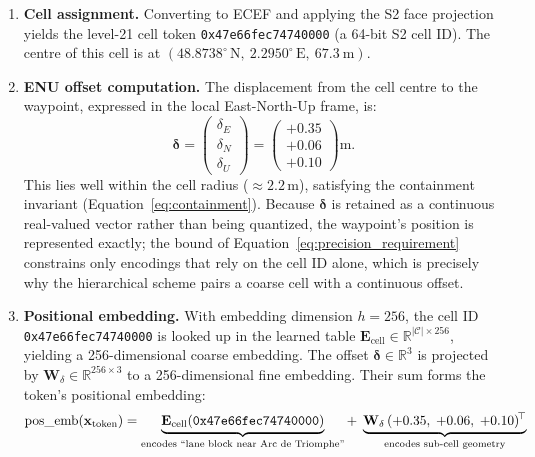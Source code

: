 \documentclass{book}
\begin{document}
\begin{enumerate}

  \item \textbf{Cell assignment.}
  Converting to ECEF and applying the S2 face projection yields the
  level-21 cell token \texttt{0x47e66fec74740000} (a 64-bit S2 cell ID).
  The centre of this cell is at
  $(48.8738^\circ\,\text{N},\ 2.2950^\circ\,\text{E},\ 67.3\ \text{m})$.

  \item \textbf{ENU offset computation.}
  The displacement from the cell centre to the waypoint, expressed
  in the local East-North-Up frame, is:
  \[
    \boldsymbol{\delta}
    = \begin{pmatrix} \delta_E \\ \delta_N \\ \delta_U \end{pmatrix}
    = \begin{pmatrix} +0.35 \\ +0.06 \\ +0.10 \end{pmatrix} \text{m}.
  \]
  This lies well within the cell radius ($\approx 2.2$\,m),
  satisfying the containment invariant
  (Equation~\ref{eq:containment}).
  Because $\boldsymbol{\delta}$ is retained as a continuous
  real-valued vector rather than being quantized, the waypoint's
  position is represented exactly; the bound of
  Equation~\eqref{eq:precision_requirement} constrains only encodings
  that rely on the cell ID alone, which is precisely why the
  hierarchical scheme pairs a coarse cell with a continuous offset.

  \item \textbf{Positional embedding.}
  With embedding dimension $h = 256$, the cell ID \texttt{0x47e66fec74740000}
  is looked up in the learned table
  $\mathbf{E}_{\text{cell}} \in \mathbb{R}^{|\mathcal{C}| \times 256}$,
  yielding a 256-dimensional coarse embedding.
  The offset $\boldsymbol{\delta} \in \mathbb{R}^3$ is projected by
  $\mathbf{W}_\delta \in \mathbb{R}^{256 \times 3}$ to a
  256-dimensional fine embedding.
  Their sum forms the token's positional embedding:
  \begin{equation}
    \text{pos\_emb}(\mathbf{x}_{\text{token}})
    =
    \underbrace{%
      \mathbf{E}_{\text{cell}}(\texttt{0x47e66fec74740000})
    }_{\text{encodes ``lane block near Arc de Triomphe''}}
    +\;
    \underbrace{%
      \mathbf{W}_{\delta}\,
      (+0.35,\; {+0.06},\; {+0.10})^{\!\top}
    }_{\text{encodes sub-cell geometry}}
    \label{eq:pos_emb}
  \end{equation}

\end{enumerate}
\end{document}
